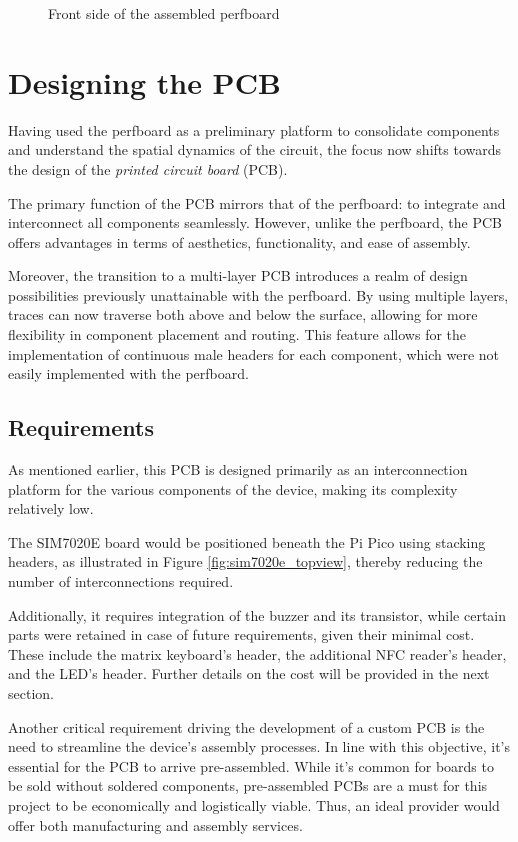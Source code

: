 \begin{figure}[h]
\begin{minipage}[b]{0.45\textwidth}
        \caption{Front side of the assembled perfboard}
        \label{fig:perfboard_assembled_front}
    \end{minipage}
\end{figure}


\section{Designing the PCB}

Having used the perfboard as a preliminary platform to consolidate components and understand the spatial 
dynamics of the circuit, the focus now shifts towards the design of the \textit{printed circuit board} 
(PCB).

The primary function of the PCB mirrors that of the perfboard: to integrate and interconnect all 
components seamlessly. However, unlike the perfboard, the PCB offers advantages in terms of aesthetics, 
functionality, and ease of assembly.

Moreover, the transition to a multi-layer PCB introduces a realm of design possibilities previously 
unattainable with the perfboard. By using multiple layers, traces can now traverse both above and below 
the surface, allowing for more flexibility in component placement and routing. This feature allows for 
the implementation of continuous male headers for each component, which were not easily implemented with 
the perfboard.


\subsection{Requirements}

As mentioned earlier, this PCB is designed primarily as an interconnection platform for the various 
components of the device, making its complexity relatively low.

The SIM7020E board would be positioned beneath the Pi Pico using stacking headers, as illustrated in 
Figure \ref{fig:sim7020e_topview}, thereby reducing the number of interconnections required. 

Additionally, it requires integration of the buzzer and its transistor, while certain parts were retained 
in case of future requirements, given their minimal cost. These include the matrix keyboard's header, the 
additional NFC reader's header, and the LED's header. Further details on the cost will be provided in the 
next section.

Another critical requirement driving the development of a custom PCB is the need to streamline the 
device's assembly processes. In line with this objective, it's essential for the PCB to arrive 
pre-assembled. While it's common for boards to be sold without soldered components, pre-assembled PCBs are 
a must for this project to be economically and logistically viable. Thus, an ideal provider would offer 
both manufacturing and assembly services.


